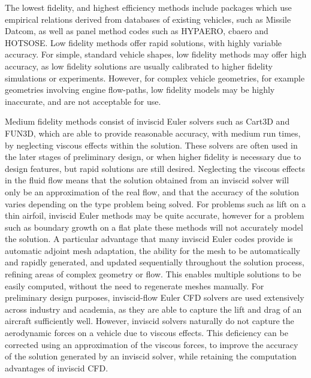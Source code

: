 The lowest fidelity, and highest efficiency methods include packages which use empirical relations derived from databases of existing vehicles, such as Missile Datcom\cite{Rosema2011}, as well as panel method codes such as HYPAERO\cite{Preller2017b}, cbaero\cite{Kinney2004} and HOTSOSE\cite{hotsose}. Low fidelity methods offer rapid solutions, with highly variable accuracy. For simple, standard vehicle shapes, low fidelity methods may offer high accuracy, as low fidelity solutions are usually calibrated to higher fidelity simulations or experiments. However, for complex vehicle geometries, for example geometries involving engine flow-paths, low fidelity models may be highly inaccurate, and are not acceptable for use\cite{Krause2011}. 

Medium fidelity methods consist of inviscid Euler solvers such as Cart3D\cite{CART3D} and FUN3D\cite{fun3d}, which are able to provide reasonable accuracy, with medium run times, by neglecting viscous effects within the solution. These solvers are often used in the later stages of preliminary design, or when higher fidelity is necessary due to design features, but rapid solutions are still desired.  Neglecting the viscous effects in the fluid flow means that the solution obtained from an inviscid solver will only be an approximation of the real flow, and that the accuracy of the solution varies depending on the type problem being solved. For problems such as lift on a thin airfoil, inviscid Euler methods may be quite accurate, however for a problem such as boundary growth on a flat plate these methods will not accurately model the solution\cite{NASAEuler}. A particular advantage that many inviscid Euler codes provide is automatic adjoint mesh adaptation, the ability for the mesh to be automatically and rapidly generated, and updated sequentially throughout the solution process, refining areas of complex geometry or flow. This enables multiple solutions to be easily computed, without the need to regenerate meshes manually. For preliminary design purposes, inviscid-flow Euler CFD solvers are used extensively across industry and academia\cite{Almosnino2016}, as they are able to capture the lift and drag of an aircraft sufficiently well. However, inviscid solvers naturally do not capture the aerodynamic forces on a vehicle due to viscous effects. This deficiency can be corrected using an approximation of the viscous forces, to improve the accuracy of the solution generated by an inviscid solver, while retaining the computation advantages of inviscid CFD\cite{Ward2018}. 

